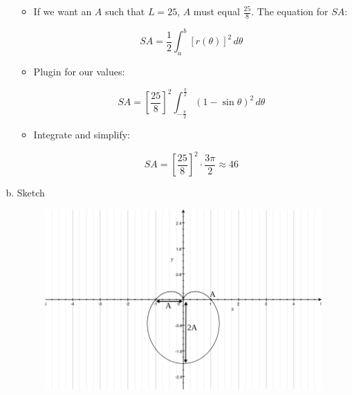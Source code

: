 \documentclass[11pt]{article}
\begin{document}
\begin{enumerate}[a)]
\begin{itemize}
			\item If we want an $A$ such that $L = 25$, $A$ must equal $\frac{25}{8}$. The equation for $SA$:
			
				\begin{equation*}
					SA = \frac12\int_a^b \left[r(\theta)\right]^2\, d\theta
				\end{equation*}
		
			\item Plugin for our values:
			
				\begin{equation*}
					SA = \left[\frac{25}{8}\right]^2\int_{-\frac\pi2}^{\frac\pi2} (1 - \sin\theta)^2 \, d\theta
				\end{equation*}
				
			\item Integrate and simplify:
				
				\begin{equation*}
					SA = \left[\frac{25}{8}\right]^2 \cdot \frac{3\pi}{2} \approx 46
				\end{equation*}
		\end{itemize}

	\item Sketch

\begin{figure}[h]
     \centering
          \label{graph.png}
          \includegraphics*[width=\linewidth]{graph}
\end{figure}

\end{enumerate}
\end{document}
